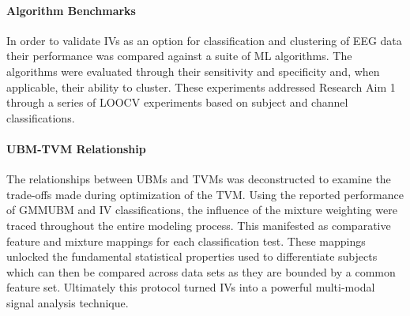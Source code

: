 \paragraph*{Algorithm Benchmarks}
In order to validate \acp{IV} as an option for classification and clustering of \ac{EEG} data their performance was compared against a suite of \ac{ML} algorithms. The algorithms were evaluated through their sensitivity and specificity and, when applicable, their ability to cluster. These experiments addressed Research Aim 1 through a series of \ac{LOOCV} experiments based on subject and channel classifications.  

\paragraph*{\ac{UBM}-\ac{TVM} Relationship}
The relationships between \acp{UBM} and \acp{TVM} was deconstructed to examine the trade-offs made during optimization of the \ac{TVM}. Using the reported performance of \ac{GMMUBM} and \ac{IV} classifications, the influence of the mixture weighting were traced throughout the entire modeling process. This manifested as comparative feature and mixture mappings for each classification test. These mappings unlocked the fundamental statistical properties used to differentiate subjects which can then be compared across data sets as they are bounded by a common feature set. Ultimately this protocol turned \acp{IV} into a powerful multi-modal signal analysis technique.